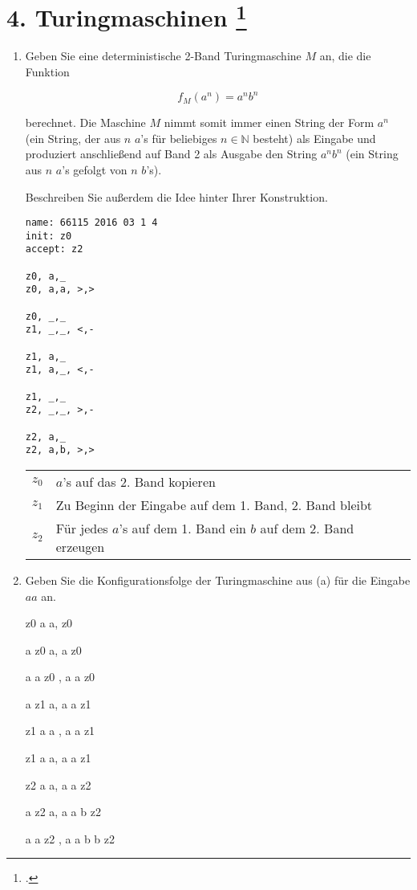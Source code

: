 \documentclass{bschlangaul-aufgabe}
\begin{document}
\let\l=\bTuringLeerzeichen

\bAufgabenTitel{}
\section{4. Turingmaschinen
\footcite{examen:66115:2016:03}}

\begin{enumerate}


\item Geben Sie eine deterministische 2-Band Turingmaschine $M$ an, die
die Funktion

\begin{displaymath}
f_M(a^n) = a^n b^n
\end{displaymath}

berechnet. Die Maschine $M$ nimmt somit immer einen String der Form
$a^n$ (ein String, der aus $n$ $a$’s für beliebiges $n \in \mathbb{N}$
besteht) als Eingabe und produziert anschließend auf Band 2 als Ausgabe
den String $a^n b^n$ (ein String aus $n$ $a$’s gefolgt von $n$ $b$’s).

Beschreiben Sie außerdem die Idee hinter Ihrer Konstruktion.

\begin{liAntwort}
\begin{verbatim}
name: 66115 2016 03 1 4
init: z0
accept: z2

z0, a,_
z0, a,a, >,>

z0, _,_
z1, _,_, <,-

z1, a,_
z1, a,_, <,-

z1, _,_
z2, _,_, >,-

z2, a,_
z2, a,b, >,>
\end{verbatim}

\begin{tabular}{c|l}
$z_0$ & $a$’s auf das 2. Band kopieren \\
$z_1$ & Zu Beginn der Eingabe auf dem 1. Band, 2. Band bleibt\\
$z_2$ & Für jedes $a$’s auf dem 1. Band ein $b$ auf dem 2. Band erzeugen\\
\end{tabular}
\end{liAntwort}

\item Geben Sie die Konfigurationsfolge der Turingmaschine aus (a) für
die Eingabe $aa$ an.

\begin{liAntwort}
z0 a a,
z0 \l \l

a z0 a,
a z0 \l

a a z0 \l,
a a z0 \l

a z1 a,
a a z1 \l

z1 a a \l,
a a z1 \l

z1 \l a a,
a a z1 \l

z2 a a,
a a z2 \l

a z2 a,
a a b z2 \l

a a z2 \l,
a a b b z2 \l
\end{liAntwort}

\end{enumerate}
\end{document}
